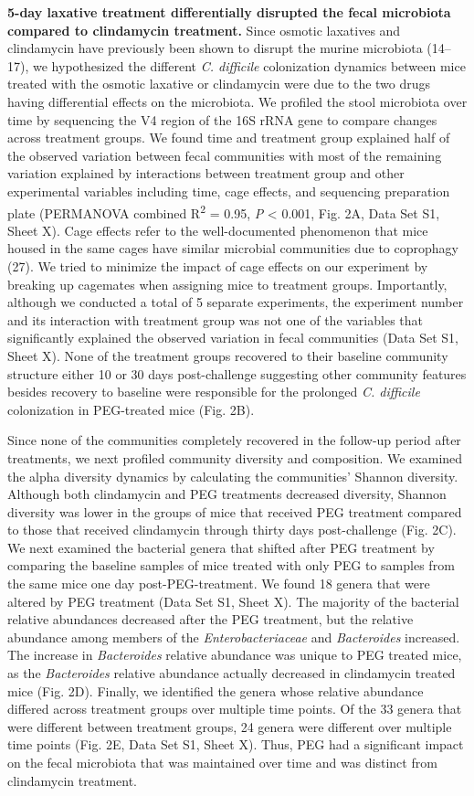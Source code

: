 \documentclass[
  11pt,
]{article}
\begin{document}
\textbf{5-day laxative treatment differentially disrupted the fecal
microbiota compared to clindamycin treatment.} Since osmotic laxatives
and clindamycin have previously been shown to disrupt the murine
microbiota (14--17), we hypothesized the different \emph{C. difficile}
colonization dynamics between mice treated with the osmotic laxative or
clindamycin were due to the two drugs having differential effects on the
microbiota. We profiled the stool microbiota over time by sequencing the
V4 region of the 16S rRNA gene to compare changes across treatment
groups. We found time and treatment group explained half of the observed
variation between fecal communities with most of the remaining variation
explained by interactions between treatment group and other experimental
variables including time, cage effects, and sequencing preparation plate
(PERMANOVA combined R\textsuperscript{2} = 0.95, \emph{P} \textless{}
0.001, Fig. 2A, Data Set S1, Sheet X). Cage effects refer to the
well-documented phenomenon that mice housed in the same cages have
similar microbial communities due to coprophagy (27). We tried to
minimize the impact of cage effects on our experiment by breaking up
cagemates when assigning mice to treatment groups. Importantly, although
we conducted a total of 5 separate experiments, the experiment number
and its interaction with treatment group was not one of the variables
that significantly explained the observed variation in fecal communities
(Data Set S1, Sheet X). None of the treatment groups recovered to their
baseline community structure either 10 or 30 days post-challenge
suggesting other community features besides recovery to baseline were
responsible for the prolonged \emph{C. difficile} colonization in
PEG-treated mice (Fig. 2B).

Since none of the communities completely recovered in the follow-up
period after treatments, we next profiled community diversity and
composition. We examined the alpha diversity dynamics by calculating the
communities' Shannon diversity. Although both clindamycin and PEG
treatments decreased diversity, Shannon diversity was lower in the
groups of mice that received PEG treatment compared to those that
received clindamycin through thirty days post-challenge (Fig. 2C). We
next examined the bacterial genera that shifted after PEG treatment by
comparing the baseline samples of mice treated with only PEG to samples
from the same mice one day post-PEG-treatment. We found 18 genera that
were altered by PEG treatment (Data Set S1, Sheet X). The majority of
the bacterial relative abundances decreased after the PEG treatment, but
the relative abundance among members of the \emph{Enterobacteriaceae}
and \emph{Bacteroides} increased. The increase in \emph{Bacteroides}
relative abundance was unique to PEG treated mice, as the
\emph{Bacteroides} relative abundance actually decreased in clindamycin
treated mice (Fig. 2D). Finally, we identified the genera whose relative
abundance differed across treatment groups over multiple time points. Of
the 33 genera that were different between treatment groups, 24 genera
were different over multiple time points (Fig. 2E, Data Set S1, Sheet
X). Thus, PEG had a significant impact on the fecal microbiota that was
maintained over time and was distinct from clindamycin treatment.
\end{document}
